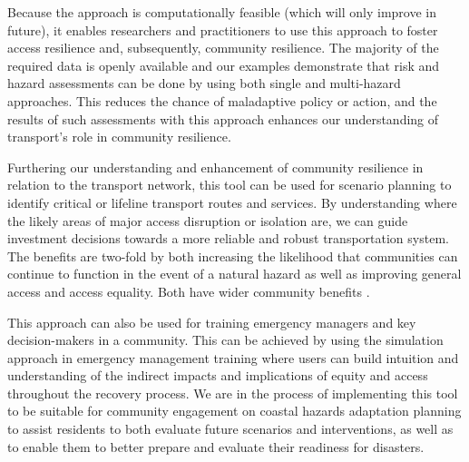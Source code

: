 \documentclass[review,3p,times,onecolumn,sort&compress,12pt]{elsarticle}
\let \cite \parencite
\begin{document}
Because the approach is computationally feasible (which will only improve in future), it enables researchers and practitioners to use this approach to foster access resilience and, subsequently, community resilience.
The majority of the required data is openly available and our examples demonstrate that risk and hazard assessments can be done by using both single and multi-hazard approaches.
This reduces the chance of maladaptive policy or action, and the results of such assessments with this approach enhances our understanding of transport's role in community resilience.


Furthering our understanding and enhancement of community resilience in relation to the transport network, this tool can be used for scenario planning to identify critical or lifeline transport routes and services.
By understanding where the likely areas of major access disruption or isolation are, we can guide investment decisions towards a more reliable and robust transportation system.
The benefits are two-fold by both increasing the likelihood that communities can continue to function in the event of a natural hazard as well as improving general access and access equality. 
Both have wider community benefits \cite{logan2020reframing, Frazier2013-wd}. 



This approach can also be used for training emergency managers and key decision-makers in a community. 
This can be achieved by using the simulation approach in emergency management training where users can build intuition and understanding of the indirect impacts and implications of equity and access throughout the recovery process.
We are in the process of implementing this tool to be suitable for community engagement on coastal hazards adaptation planning to assist residents to both evaluate future scenarios and interventions, as well as to enable them to better prepare and evaluate their readiness for disasters.
\end{document}
